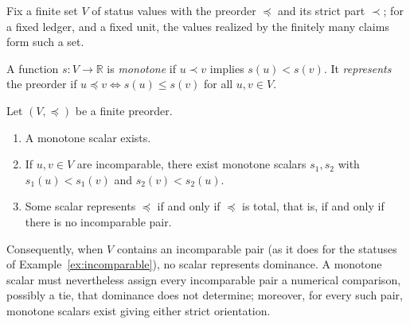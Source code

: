 Fix a finite set $V$ of status values with the preorder $\preceq$ and its strict part $\prec$; for a fixed ledger, and a fixed unit, the values realized by the finitely many claims form such a set.

\begin{definition}\label{def:monotone}
A function $s:V\to\mathbb R$ is \emph{monotone} if $u\prec v$ implies $s(u)<s(v)$. It \emph{represents} the preorder if $u\preceq v\Leftrightarrow s(u)\le s(v)$ for all $u,v\in V$.
\end{definition}

\begin{theorem}\label{thm:noscalar}
Let $(V,\preceq)$ be a finite preorder.
\begin{enumerate}[label=(\alph*)]
\item A monotone scalar exists.
\item If $u,v\in V$ are incomparable, there exist monotone scalars $s_1,s_2$ with $s_1(u)<s_1(v)$ and $s_2(v)<s_2(u)$.
\item Some scalar represents $\preceq$ if and only if $\preceq$ is total, that is, if and only if there is no incomparable pair.
\end{enumerate}
Consequently, when $V$ contains an incomparable pair (as it does for the statuses of Example~\ref{ex:incomparable}), no scalar represents dominance. A monotone scalar must nevertheless assign every incomparable pair a numerical comparison, possibly a tie, that dominance does not determine; moreover, for every such pair, monotone scalars exist giving either strict orientation.
\end{theorem}

